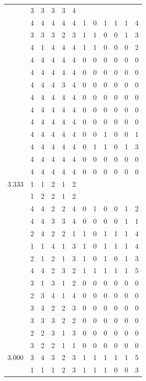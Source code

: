 \documentclass[]{book}
\theoremstyle{definition}
\theoremstyle{definition}
\theoremstyle{definition}
\theoremstyle{remark}
\begin{document}
\begin{table}
{\begin{tabular}[t]{rrrrrrrrrrrr}
 & 3 & 3 & 3 & 3 & 4 &  &  &  &  &  & \\
 & 4 & 4 & 4 & 4 & 4 & 1 & 0 & 1 & 1 & 1 & 4\\
 & 3 & 3 & 3 & 2 & 3 & 1 & 1 & 0 & 0 & 1 & 3\\
 & 4 & 1 & 4 & 4 & 4 & 1 & 1 & 0 & 0 & 0 & 2\\
 & 4 & 4 & 4 & 4 & 4 & 0 & 0 & 0 & 0 & 0 & 0\\
 & 4 & 4 & 4 & 4 & 4 & 0 & 0 & 0 & 0 & 0 & 0\\
 & 4 & 4 & 4 & 3 & 4 & 0 & 0 & 0 & 0 & 0 & 0\\
 & 4 & 4 & 4 & 4 & 4 & 0 & 0 & 0 & 0 & 0 & 0\\
 & 4 & 4 & 4 & 4 & 4 & 0 & 0 & 0 & 0 & 0 & 0\\
 & 4 & 4 & 4 & 4 & 4 & 0 & 0 & 0 & 0 & 0 & 0\\
 & 4 & 4 & 4 & 4 & 4 & 0 & 0 & 1 & 0 & 0 & 1\\
 & 4 & 4 & 4 & 4 & 4 & 0 & 1 & 1 & 0 & 1 & 3\\
 & 4 & 4 & 4 & 4 & 4 & 0 & 0 & 0 & 0 & 0 & 0\\
 & 4 & 4 & 4 & 4 & 4 & 0 & 0 & 0 & 0 & 0 & 0\\
3.333 & 1 & 1 & 2 & 1 & 2 &  &  &  &  &  & \\
 & 1 & 2 & 2 & 1 & 2 &  &  &  &  &  & \\
 & 4 & 4 & 2 & 2 & 4 & 0 & 1 & 0 & 0 & 1 & 2\\
 & 4 & 4 & 3 & 3 & 4 & 0 & 0 & 0 & 0 & 1 & 1\\
 & 2 & 4 & 2 & 2 & 1 & 1 & 0 & 1 & 1 & 1 & 4\\
 & 1 & 1 & 4 & 1 & 3 & 1 & 0 & 1 & 1 & 1 & 4\\
 & 2 & 1 & 2 & 1 & 3 & 1 & 0 & 1 & 0 & 1 & 3\\
 & 4 & 4 & 2 & 3 & 2 & 1 & 1 & 1 & 1 & 1 & 5\\
 & 3 & 1 & 3 & 1 & 2 & 0 & 0 & 0 & 0 & 0 & 0\\
 & 2 & 3 & 4 & 1 & 4 & 0 & 0 & 0 & 0 & 0 & 0\\
 & 3 & 4 & 2 & 2 & 3 & 0 & 0 & 0 & 0 & 0 & 0\\
 & 3 & 3 & 3 & 2 & 2 & 0 & 0 & 0 & 0 & 0 & 0\\
 & 2 & 2 & 3 & 1 & 3 & 0 & 0 & 0 & 0 & 0 & 0\\
 & 3 & 2 & 2 & 1 & 1 & 0 & 0 & 0 & 0 & 0 & 0\\
3.000 & 3 & 4 & 3 & 2 & 3 & 1 & 1 & 1 & 1 & 1 & 5\\
 & 1 & 1 & 1 & 2 & 3 & 1 & 1 & 1 & 0 & 0 & 3\\

\end{tabular}}
\end{table}
\end{document}
